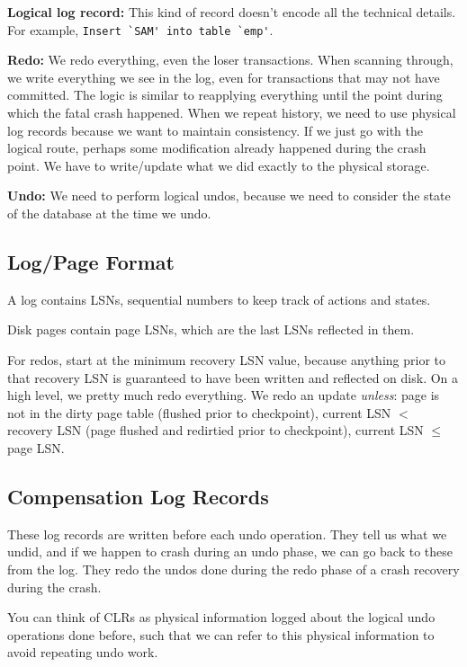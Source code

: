 \documentclass{article}
\begin{document}
\textbf{Logical log record:} This kind of record doesn't encode all the technical details. For example, \verb|Insert `SAM' into table `emp'|.

\textbf{Redo:} We redo everything, even the loser transactions. When scanning through, we write everything we see in the log, even for transactions that may not have committed. The logic is similar to reapplying everything until the point during which the fatal crash happened. When we repeat history, we need to use physical log records because we want to maintain consistency. If we just go with the logical route, perhaps some modification already happened during the crash point. We have to write/update what we did exactly to the physical storage.

\textbf{Undo:} We need to perform logical undos, because we need to consider the state of the database at the time we undo.

\subsection{Log/Page Format}

A log contains LSNs, sequential numbers to keep track of actions and states.

Disk pages contain page LSNs, which are the last LSNs reflected in them.

For redos, start at the minimum recovery LSN value, because anything prior to that recovery LSN is guaranteed to have been written and reflected on disk. On a high level, we pretty much redo everything. We redo an update \emph{unless}: page is not in the dirty page table (flushed prior to checkpoint), current LSN $<$ recovery LSN (page flushed and redirtied prior to checkpoint), current LSN $\leq$ page LSN.

\subsection{Compensation Log Records}

These log records are written before each undo operation. They tell us what we undid, and if we happen to crash during an undo phase, we can go back to these from the log. They redo the undos done during the redo phase of a crash recovery during the crash.

You can think of CLRs as physical information logged about the logical undo operations done before, such that we can refer to this physical information to avoid repeating undo work.
\end{document}
